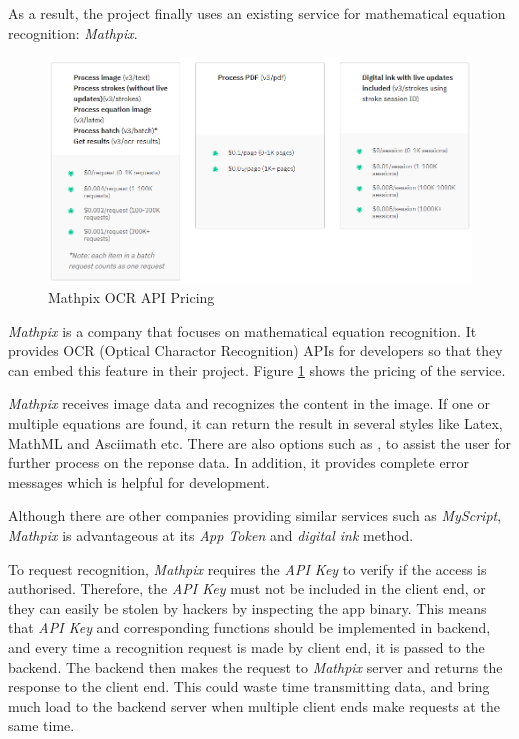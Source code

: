 \documentclass[12pt,twoside]{report}
\begin{document}
As a result, the project finally uses an existing service for mathematical equation recognition: \textit{Mathpix}.

\begin{figure}[h]
    \centering
    \includegraphics[width=\hsize]{figures/mathpix-pricing.png}
    \caption{Mathpix OCR API Pricing \cite{mathpix-pricing}}
    \label{fig:mathpix-pricing}
\end{figure}

\textit{Mathpix} is a company that focuses on mathematical equation recognition.
It provides OCR (Optical Charactor Recognition) APIs for developers so that they
can embed this feature in their project. Figure \ref{fig:mathpix-pricing} shows
the pricing of the service.

\textit{Mathpix} receives image data and recognizes the content in the image. If one or multiple equations are found, it can return the result in several styles like Latex, MathML and Asciimath etc. There are also options such as ,  to assist the user for further process on the reponse data. In addition, it provides complete error messages which is helpful for development.

Although there are other companies providing similar services such as \textit{MyScript}, \textit{Mathpix} is advantageous at its \textit{App Token} and \textit{digital ink} method.

To request recognition, \textit{Mathpix} requires the \textit{API Key} to verify
if the access is authorised. Therefore, the \textit{API Key} must not be
included in the client end, or they can easily be stolen by hackers by
inspecting the app binary. This means that \textit{API Key} and corresponding
functions should be implemented in backend, and every time a recognition request
is made by client end, it is passed to the backend. The backend then makes the request to \textit{Mathpix} server and returns the response to the client end. This could waste time transmitting data, and bring much load to the backend server when multiple client ends make requests at the same time. 
\end{document}
